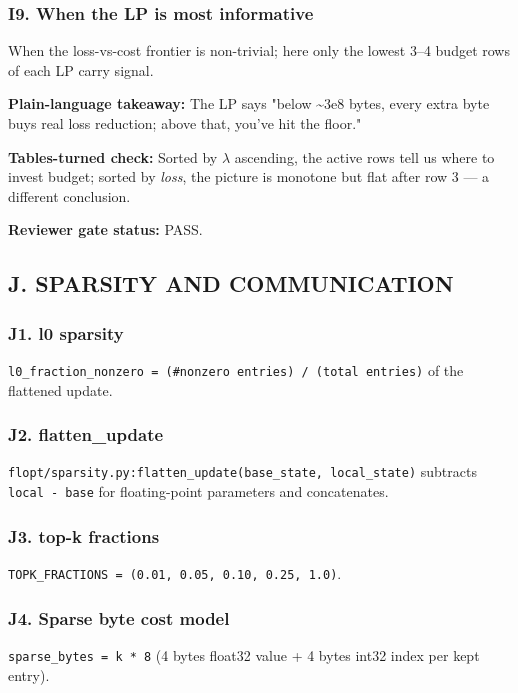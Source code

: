 \documentclass{article}
\begin{document}
\subsubsection{I9. When the LP is most informative}


When the loss-vs-cost frontier is non-trivial; here only the lowest 3--4 budget rows of each LP carry signal.


\textbf{Plain-language takeaway:} The LP says "below \textasciitilde{}3e8 bytes, every extra byte buys real loss reduction; above that, you've hit the floor."


\textbf{Tables-turned check:} Sorted by \ensuremath{\lambda} ascending, the active rows tell us where to invest budget; sorted by \emph{loss}, the picture is monotone but flat after row 3 --- a different conclusion.


\textbf{Reviewer gate status:} PASS.


\subsection{J. SPARSITY AND COMMUNICATION}


\subsubsection{J1. l0 sparsity}


\texttt{l0\_fraction\_nonzero = (\#nonzero entries) / (total entries)} of the flattened update.


\subsubsection{J2. flatten\_update}


\texttt{flopt/sparsity.py:flatten\_update(base\_state, local\_state)} subtracts \texttt{local - base} for floating-point parameters and concatenates.


\subsubsection{J3. top-k fractions}


\texttt{TOPK\_FRACTIONS = (0.01, 0.05, 0.10, 0.25, 1.0)}.


\subsubsection{J4. Sparse byte cost model}


\texttt{sparse\_bytes = k * 8} (4 bytes float32 value + 4 bytes int32 index per kept entry).
\end{document}
